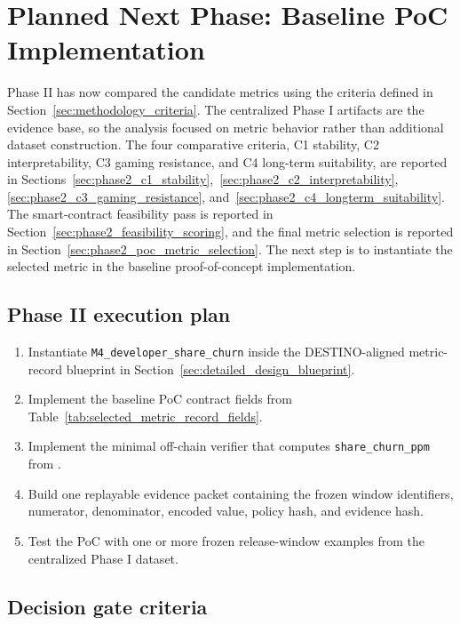 \section{Planned Next Phase: Baseline PoC Implementation}
\label{sec:phase2_plan}

Phase II has now compared the candidate metrics using the criteria defined in
Section~\ref{sec:methodology_criteria}. The centralized Phase I artifacts are the evidence base,
so the analysis focused on metric behavior rather than additional dataset construction.
The four comparative criteria, C1 stability, C2 interpretability, C3 gaming resistance, and C4 long-term suitability,
are reported in Sections~\ref{sec:phase2_c1_stability},~\ref{sec:phase2_c2_interpretability},
\ref{sec:phase2_c3_gaming_resistance}, and~\ref{sec:phase2_c4_longterm_suitability}. The smart-contract
feasibility pass is reported in Section~\ref{sec:phase2_feasibility_scoring}, and the final metric selection is
reported in Section~\ref{sec:phase2_poc_metric_selection}. The next step is to instantiate the selected metric in
the baseline proof-of-concept implementation.

\subsection{Phase II execution plan}
\label{sec:phase2_execution}

\begin{enumerate}[leftmargin=*]
  \item Instantiate \texttt{M4\_developer\_share\_churn} inside the DESTINO-aligned metric-record blueprint in Section~\ref{sec:detailed_design_blueprint}.
  \item Implement the baseline PoC contract fields from Table~\ref{tab:selected_metric_record_fields}.
  \item Implement the minimal off-chain verifier that computes \texttt{share\_churn\_ppm} from .
  \item Build one replayable evidence packet containing the frozen window identifiers, numerator, denominator, encoded value, policy hash, and evidence hash.
  \item Test the PoC with one or more frozen release-window examples from the centralized Phase I dataset.
\end{enumerate}

\subsection{Decision gate criteria}
\label{sec:phase2_gate}


